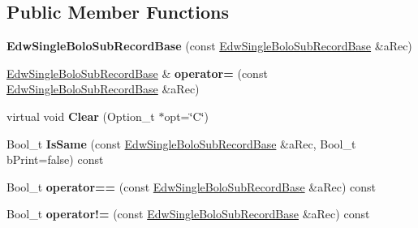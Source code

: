 \subsection*{Public Member Functions}
\begin{DoxyCompactItemize}
\item 
\hypertarget{class_edw_single_bolo_sub_record_base_aa9b557d03c2740078fd1063ec06bed08}{
{\bfseries EdwSingleBoloSubRecordBase} (const \hyperlink{class_edw_single_bolo_sub_record_base}{EdwSingleBoloSubRecordBase} \&aRec)}
\label{class_edw_single_bolo_sub_record_base_aa9b557d03c2740078fd1063ec06bed08}

\item 
\hypertarget{class_edw_single_bolo_sub_record_base_a734c35c550c9413d209213004454e9d5}{
\hyperlink{class_edw_single_bolo_sub_record_base}{EdwSingleBoloSubRecordBase} \& {\bfseries operator=} (const \hyperlink{class_edw_single_bolo_sub_record_base}{EdwSingleBoloSubRecordBase} \&aRec)}
\label{class_edw_single_bolo_sub_record_base_a734c35c550c9413d209213004454e9d5}

\item 
\hypertarget{class_edw_single_bolo_sub_record_base_aa9f75edd46d88ac3c78349dfba980339}{
virtual void {\bfseries Clear} (Option\_\-t $\ast$opt=\char`\"{}C\char`\"{})}
\label{class_edw_single_bolo_sub_record_base_aa9f75edd46d88ac3c78349dfba980339}

\item 
\hypertarget{class_edw_single_bolo_sub_record_base_af1fb098249395b8d11ced9686a793428}{
Bool\_\-t {\bfseries IsSame} (const \hyperlink{class_edw_single_bolo_sub_record_base}{EdwSingleBoloSubRecordBase} \&aRec, Bool\_\-t bPrint=false) const }
\label{class_edw_single_bolo_sub_record_base_af1fb098249395b8d11ced9686a793428}

\item 
\hypertarget{class_edw_single_bolo_sub_record_base_aea303b810cbad2df1e0e2019e0d97d5c}{
Bool\_\-t {\bfseries operator==} (const \hyperlink{class_edw_single_bolo_sub_record_base}{EdwSingleBoloSubRecordBase} \&aRec) const }
\label{class_edw_single_bolo_sub_record_base_aea303b810cbad2df1e0e2019e0d97d5c}

\item 
\hypertarget{class_edw_single_bolo_sub_record_base_aff1f3d808fcfa331089afdd1085a4fda}{
Bool\_\-t {\bfseries operator!=} (const \hyperlink{class_edw_single_bolo_sub_record_base}{EdwSingleBoloSubRecordBase} \&aRec) const }
\label{class_edw_single_bolo_sub_record_base_aff1f3d808fcfa331089afdd1085a4fda}


\end{DoxyCompactItemize}
